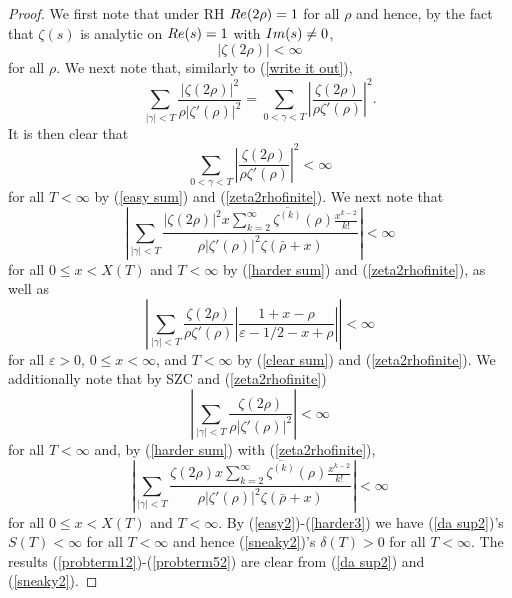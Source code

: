 \documentclass[11pt,article]{amsart}
\numberwithin{equation}{section}
\numberwithin{equation}{section}
\numberwithin{lemma}{section}
\numberwithin{prop}{section}
\begin{document}
\begin{proof}
We first note that under RH $\textnormal{Re}(2\rho)=1$ for all $\rho$ and hence, by the fact that $\zeta(s)$ is analytic on $\textnormal{Re}(s)=1$ with $\textnormal{Im}(s)\neq 0$, 
\begin{equation}
\left|\zeta(2\rho)\right|<\infty \label{zeta2rhofinite}
\end{equation}
for all $\rho$. We next note that, similarly to (\ref{write it out}), 
\begin{equation}
\sum_{\left|\gamma\right|<T}\frac{\left|\zeta(2\rho)\right|^{2}}{\rho\left|\zeta'(\rho)\right|^{2}}=\sum_{0<\gamma<T}\left|\frac{\zeta(2\rho)}{\rho\zeta'(\rho)}\right|^{2}. \label{write it out2}
\end{equation}
It is then clear that 
\begin{equation}
\sum_{0<\gamma<T}\left|\frac{\zeta(2\rho)}{\rho\zeta'(\rho)}\right|^{2}<\infty \label{easy2}
\end{equation}
for all $T<\infty$ by (\ref{easy sum}) and (\ref{zeta2rhofinite}). We next note that 
\begin{equation}
\left|\sum_{\left|\gamma\right|<T}\frac{\left|\zeta(2\rho)\right|^{2}x\sum_{k=2}^{\infty}\overline{\zeta^{(k)}}(\rho)\frac{x^{k-2}}{k!}}{\rho\left|\zeta'(\rho)\right|^{2}\zeta\left(\bar{\rho}+x\right)}\right|<\infty \label{harder2}
\end{equation}
for all $0\leq x<X(T)$ and $T<\infty$ by (\ref{harder sum}) and (\ref{zeta2rhofinite}), as well as  
\begin{equation}
\left|\sum_{\left|\gamma\right|<T}\frac{\zeta(2\rho)}{\rho\zeta'(\rho)}\left|\frac{1+x-\rho}{\varepsilon-1/2-x+\rho}\right|\right|<\infty \label{clear2}
\end{equation}
for all $\varepsilon>0$, $0\leq x<\infty$, and $T<\infty$ by (\ref{clear sum}) and (\ref{zeta2rhofinite}). We additionally note that by SZC and (\ref{zeta2rhofinite})
\begin{equation}
\left|\sum_{\left|\gamma\right|<T}\frac{\zeta(2\rho)}{\rho\left|\zeta'(\rho)\right|^{2}}\right|<\infty \label{easy3}
\end{equation}
for all $T<\infty$ and, by (\ref{harder sum}) with (\ref{zeta2rhofinite}),
\begin{equation}
\left|\sum_{\left|\gamma\right|<T}\frac{\zeta(2\rho)x\sum_{k=2}^{\infty}\overline{\zeta^{(k)}}(\rho)\frac{x^{k-2}}{k!}}{\rho\left|\zeta'(\rho)\right|^{2}\zeta\left(\bar{\rho}+x\right)}\right|<\infty \label{harder3}
\end{equation}
for all $0\leq x<X(T)$ and $T<\infty$. By (\ref{easy2})-(\ref{harder3}) we have (\ref{da sup2})'s $S(T)<\infty$ for all $T<\infty$ and hence (\ref{sneaky2})'s $\delta(T)>0$ for all $T<\infty$. The results (\ref{probterm12})-(\ref{probterm52}) are clear from (\ref{da sup2}) and (\ref{sneaky2}).
\end{proof}
\end{document}
